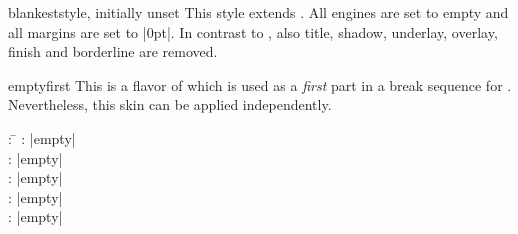 \clearpage
\begin{docTcbKey}{blankest}{}{style, initially unset}
  This style extends .
  All engines are set to empty and all margins are set to |0pt|.
  In contrast to , also title, shadow, underlay,
  overlay, finish and borderline are removed.

\begin{dispExample}
\begin{tcbraster}[raster columns=3,raster equal height,
    title=Box \thetcbrasternum,
    enhanced,size=small,colframe=red!50!black,colback=red!10!white,
    coltitle=yellow!85!black,
    drop fuzzy shadow,watermark text={Box \thetcbrasternum},
    borderline={.25mm}{-0.5mm}{green!40!black},
    finish={\begin{tcbclipframe}\draw[blue,opacity=0.1,line width=1cm]
      (frame.south west) -- (frame.north east);\end{tcbclipframe}},
    ]
  \begin{tcolorbox}\lipsum[4]\end{tcolorbox}
  \begin{tcolorbox}[blanker]\lipsum[4]\end{tcolorbox}
  \begin{tcolorbox}[blankest]\lipsum[4]\end{tcolorbox}
\end{tcbraster}
\end{dispExample}
\end{docTcbKey}


\clearpage
\begin{docSkin}{emptyfirst}
This is a flavor of  which is used as a \emph{first} part
in a break sequence for .
Nevertheless, this skin can be applied independently.
\begin{tcolorbox}[skintable=emptyfirst]
  \begin{tabbing}
    : \=\kill
    :           \> |empty|\\
    : \> |empty|\\ 
    :        \> |empty|\\
    :    \> |empty|\\
    :           \> |empty|
  \end{tabbing}
\end{tcolorbox}
\end{docSkin}


